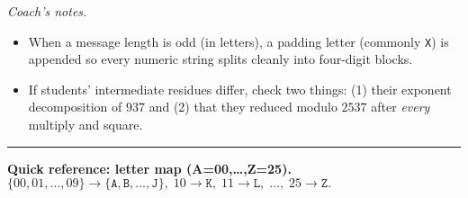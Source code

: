 \documentclass[12pt]{article}
\begin{document}
\medskip
\textit{Coach’s notes.}
\begin{itemize}
\item When a message length is odd (in letters), a padding letter (commonly \texttt{X}) is appended so every numeric string splits cleanly into four-digit blocks.
\item If students’ intermediate residues differ, check two things: (1) their exponent decomposition of \(937\) and (2) that they reduced modulo \(2537\) after \emph{every} multiply and square.
\end{itemize}

\hrule
\vspace{0.4em}
\textbf{Quick reference: letter map (A=00,\dots,Z=25).}\\
\(\{00,01,\dots,09\}\to\{\texttt{A},\texttt{B},\dots,\texttt{J}\},\;
10\to\texttt{K},\;11\to\texttt{L},\;\dots,\;25\to\texttt{Z}.\)
\end{document}
